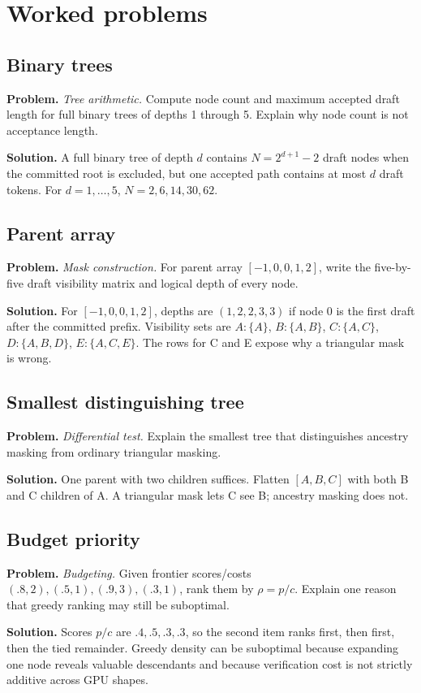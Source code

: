 \section{Worked problems}

\subsection{Binary trees}
\textbf{Problem.} \emph{Tree arithmetic.} Compute node count and maximum accepted draft length for
full binary trees of depths 1 through 5. Explain why node count is not acceptance length.

\textbf{Solution.} A full binary tree of depth $d$ contains
$N=2^{d+1}-2$ draft nodes when the committed root is excluded, but one accepted path
contains at most $d$ draft tokens. For $d=1,\ldots,5$, $N=2,6,14,30,62$.

\subsection{Parent array}
\textbf{Problem.} \emph{Mask construction.} For parent array $[-1,0,0,1,2]$, write the five-by-five
draft visibility matrix and logical depth of every node.

\textbf{Solution.} For $[-1,0,0,1,2]$, depths are $(1,2,2,3,3)$ if node 0 is
the first draft after the committed prefix. Visibility sets are
$A:\{A\}$, $B:\{A,B\}$, $C:\{A,C\}$, $D:\{A,B,D\}$, $E:\{A,C,E\}$.
The rows for C and E expose why a triangular mask is wrong.

\subsection{Smallest distinguishing tree}
\textbf{Problem.} \emph{Differential test.} Explain the smallest tree that distinguishes ancestry
masking from ordinary triangular masking.

\textbf{Solution.} One parent with two children suffices.
Flatten $[A,B,C]$ with both B and C children of A. A triangular mask lets C see B;
ancestry masking does not.

\subsection{Budget priority}
\textbf{Problem.} \emph{Budgeting.} Given frontier scores/costs $(.8,2),(.5,1),(.9,3),(.3,1)$,
rank them by $\rho=p/c$. Explain one reason that greedy ranking may still be suboptimal.

\textbf{Solution.} Scores $p/c$ are $.4,.5,.3,.3$, so the second item ranks
first, then first, then the tied remainder. Greedy density can be suboptimal because
expanding one node reveals valuable descendants and because verification cost is not
strictly additive across GPU shapes.

